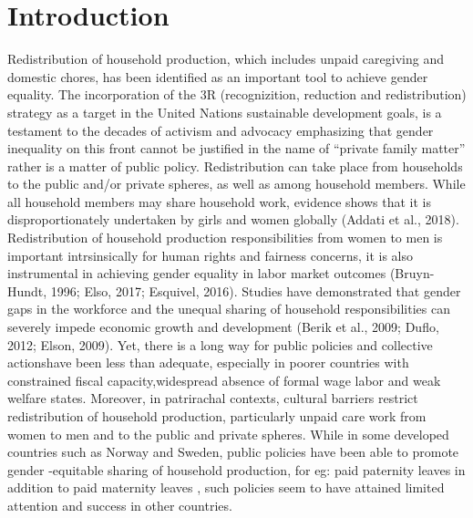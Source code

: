 \documentclass[
  11pt,
]{article}
\begin{document}
\thispagestyle{empty}
\clearpage{}
\newpage
{} %
\section{Introduction}\label{introduction}

Redistribution of household production, which includes unpaid caregiving
and domestic chores, has been identified as an important tool to achieve
gender equality. The incorporation of the 3R (recognizition, reduction
and redistribution) strategy as a target in the United Nations
sustainable development goals, is a testament to the decades of activism
and advocacy emphasizing that gender inequality on this front cannot be
justified in the name of ``private family matter'' rather is a matter of
public policy. Redistribution can take place from households to the
public and/or private spheres, as well as among household members. While
all household members may share household work, evidence shows that it
is disproportionately undertaken by girls and women globally (Addati et
al., 2018). Redistribution of household production responsibilities from
women to men is important intrsinsically for human rights and fairness
concerns, it is also instrumental in achieving gender equality in labor
market outcomes (Bruyn-Hundt, 1996; Elso, 2017; Esquivel, 2016). Studies
have demonstrated that gender gaps in the workforce and the unequal
sharing of household responsibilities can severely impede economic
growth and development (Berik et al., 2009; Duflo, 2012; Elson, 2009).
Yet, there is a long way for public policies and collective actionshave
been less than adequate, especially in poorer countries with constrained
fiscal capacity,widespread absence of formal wage labor and weak welfare
states. Moreover, in patrirachal contexts, cultural barriers restrict
redistribution of household production, particularly unpaid care work
from women to men and to the public and private spheres. While in some
developed countries such as Norway and Sweden, public policies have been
able to promote gender -equitable sharing of household production, for
eg: paid paternity leaves in addition to paid maternity leaves , such
policies seem to have attained limited attention and success in other
countries.
\end{document}
